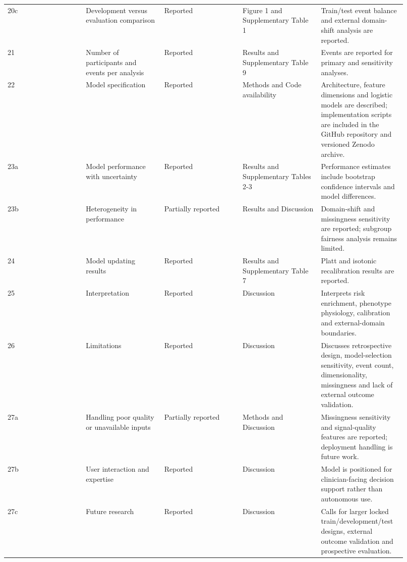 \documentclass[utf8]{frontiers_suppmat}
\begin{document}
\begin{landscape}
\begin{longtable}{L{0.184\linewidth} L{0.184\linewidth} L{0.184\linewidth} L{0.184\linewidth} L{0.184\linewidth}}
20c & Development versus evaluation comparison & Reported & Figure 1 and Supplementary Table 1 & Train/\allowbreak{}test event balance and external domain-\allowbreak{}shift analysis are reported.\allowbreak{} \\
21 & Number of participants and events per analysis & Reported & Results and Supplementary Table 9 & Events are reported for primary and sensitivity analyses.\allowbreak{} \\
22 & Model specification & Reported & Methods and Code availability & Architecture, feature dimensions and logistic models are described;\allowbreak{} implementation scripts are included in the GitHub repository and versioned Zenodo archive.\allowbreak{} \\
23a & Model performance with uncertainty & Reported & Results and Supplementary Tables 2-\allowbreak{}3 & Performance estimates include bootstrap confidence intervals and model differences.\allowbreak{} \\
23b & Heterogeneity in performance & Partially reported & Results and Discussion & Domain-\allowbreak{}shift and missingness sensitivity are reported;\allowbreak{} subgroup fairness analysis remains limited.\allowbreak{} \\
24 & Model updating results & Reported & Results and Supplementary Table 7 & Platt and isotonic recalibration results are reported.\allowbreak{} \\
25 & Interpretation & Reported & Discussion & Interprets risk enrichment, phenotype physiology, calibration and external-\allowbreak{}domain boundaries.\allowbreak{} \\
26 & Limitations & Reported & Discussion & Discusses retrospective design, model-\allowbreak{}selection sensitivity, event count, dimensionality, missingness and lack of external outcome validation.\allowbreak{} \\
27a & Handling poor quality or unavailable inputs & Partially reported & Methods and Discussion & Missingness sensitivity and signal-\allowbreak{}quality features are reported;\allowbreak{} deployment handling is future work.\allowbreak{} \\
27b & User interaction and expertise & Reported & Discussion & Model is positioned for clinician-\allowbreak{}facing decision support rather than autonomous use.\allowbreak{} \\
27c & Future research & Reported & Discussion & Calls for larger locked train/\allowbreak{}development/\allowbreak{}test designs, external outcome validation and prospective evaluation.\allowbreak{} \\
\end{longtable}
\normalsize
\end{landscape}
\end{document}
